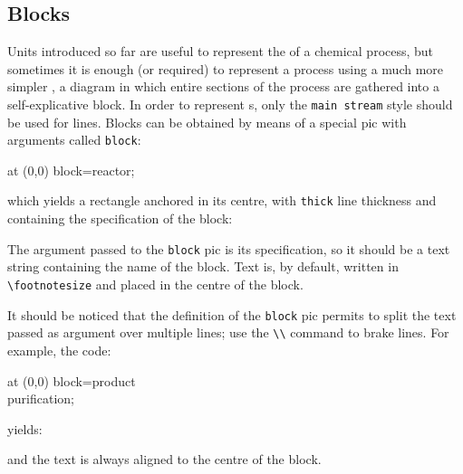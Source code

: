 \documentclass[12pt]{article}						%
\newcommand*{\ac}[1]{%
		\textsmaller{#1}%
	}
\newcommand*{\chpn}[1]{\texttt{#1}}				%
\newcommand*{\chpp}[1]{\texttt{#1}}				%
\newcommand*{\chps}[1]{\texttt{#1}}				%
\begin{document}
\subsection{Blocks}

Units introduced so far are useful to represent the \ac{PFD} of a chemical
process, but sometimes it is enough (or required) to represent a process using
a much more simpler \ac{BFD}, a diagram in which entire sections of the process
are gathered into a self-explicative block. In order to represent \ac{BFD}s,
only the \chps{main stream} style should be used for lines. Blocks can be
obtained by means of a special pic with arguments called \chpp{block}:
\begin{chpcode}
	\pic at (0,0) {block=reactor};
\end{chpcode}
which yields a rectangle anchored in its centre, with \verb|thick| line
thickness and containing the specification of the block:
\begin{center}
\end{center}

The argument passed to the \chpp{block} pic is its specification, so it should
be a text string containing the name of the block. Text is, by default, written
in \verb|\footnotesize| and placed in the centre of the block.

It should be noticed that the definition of the \chpp{block} pic permits to
split the text passed as argument over multiple lines; use the \verb|\\| command
to brake lines. For example, the code:
\begin{chpcode}
	\pic at (0,0) {block=product\\purification};
\end{chpcode}
yields:
\begin{center}
\end{center}
and the text is always aligned to the centre of the block.
\end{document}
